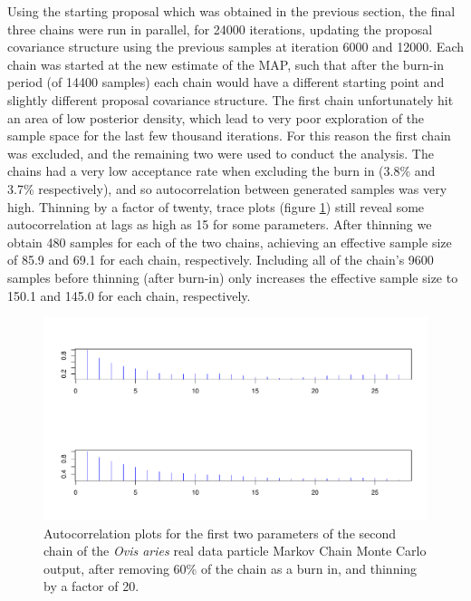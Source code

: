 \documentclass[a4paper,12pt]{article}
\begin{document}
Using the starting proposal which was obtained in the previous section, the final three chains were run in parallel, for 24000 iterations, updating the proposal covariance structure using the previous samples at iteration 6000 and 12000. Each chain was started at the new estimate of the MAP, such that after the burn-in period (of 14400 samples) each chain would have a different starting point and slightly different proposal covariance structure. The first chain unfortunately hit an area of low posterior density, which lead to very poor exploration of the sample space for the last few thousand iterations. For this reason the first chain was excluded, and the remaining two were used to conduct the analysis. The chains had a very low acceptance rate when excluding the burn in (3.8\% and 3.7\% respectively), and so autocorrelation between generated samples was very high. Thinning by a factor of twenty, trace plots (figure \ref{acf2}) still reveal some autocorrelation at lags as high as 15 for some parameters. After thinning we obtain 480 samples for each of the two chains, achieving an effective sample size of 85.9 and 69.1 for each chain, respectively. Including all of the chain's 9600 samples before thinning (after burn-in) only increases the effective sample size to 150.1 and 145.0 for each chain, respectively.

\begin{figure}[H]
\centering
\includegraphics[scale=0.55]{chainFirst2_2.PDF}
\caption{\label{acf2}Autocorrelation plots for the first two parameters of the second chain of the \textit{Ovis aries} real data particle Markov Chain Monte Carlo output, after removing 60\% of the chain as a burn in, and thinning by a factor of 20.}
\end{figure}
\end{document}
